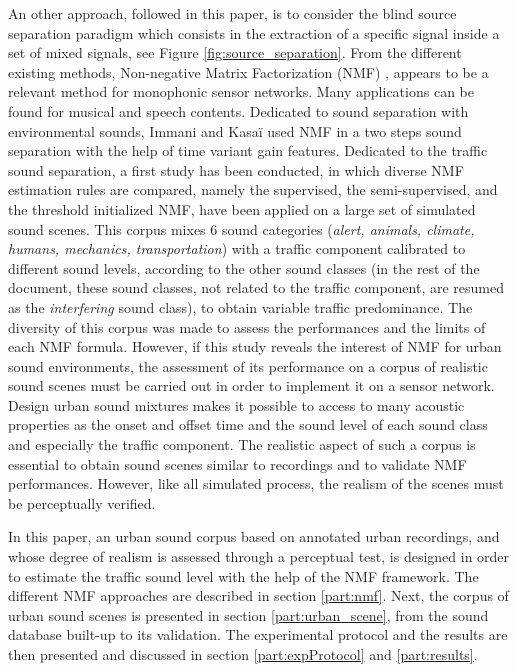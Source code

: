 \documentclass[review,5p,twocolumn,sort&compress,times]{elsarticle}
\begin{document}
An other approach, followed in this paper, is to consider the blind source separation paradigm which consists in the extraction of a specific signal inside a set of mixed signals, see Figure \ref{fig:source_separation}. From the different existing methods, Non-negative Matrix Factorization (NMF) \cite{lee_learning_1999}, appears to be a relevant method for monophonic sensor networks. Many applications can be found for musical \cite{smaragdis_non-negative_2003, benetos2006musical} and speech \cite{wilson_speech_2008, mysore2011non} contents. Dedicated to sound separation with environmental sounds, Immani and Kasa\"i \cite{satoshi_innami_nmf-based_2012} used NMF in a two steps sound separation with the help of time variant gain features. Dedicated to the traffic sound separation, a first study \cite{gloaguen2018Estimation} has been conducted, in which diverse NMF estimation rules are compared, namely the supervised, the semi-supervised, and the threshold initialized NMF, have been applied on a large set of simulated sound scenes. This corpus mixes 6 sound categories (\textit{alert, animals, climate, humans, mechanics, transportation}) with a traffic component calibrated to different sound levels, according to the other sound classes (in the rest of the document, these sound classes, not related to the traffic component, are resumed as the \textit{interfering} sound class), to obtain variable traffic predominance. 
The diversity of this corpus was made to assess the performances and the limits of each NMF formula. 
However, if this study reveals the interest of NMF for urban sound environments, the assessment of its performance on a corpus of realistic sound scenes must be carried out in order to implement it on a sensor network. 
Design urban sound mixtures makes it possible to access to many acoustic properties as the onset and offset time and the sound level of each sound class and especially the traffic component. The realistic aspect of such a corpus is essential to obtain sound scenes similar to recordings and to validate NMF performances. However, like all simulated process, the realism of the scenes must be perceptually verified. 

In this paper, an urban sound corpus based on annotated urban recordings, and whose degree of realism is assessed through a perceptual test, is designed in order to estimate the traffic sound level with the help of the NMF framework.
The different NMF approaches are described in section \ref{part:nmf}. Next, the corpus of urban sound scenes is presented in section \ref{part:urban_scene}, from the sound database built-up to its validation. The experimental protocol and the results are then presented and discussed in section \ref{part:expProtocol} and \ref{part:results}.
\end{document}

